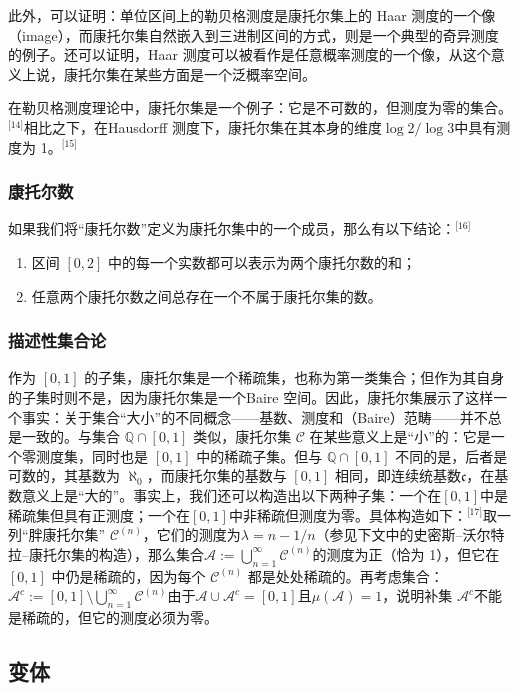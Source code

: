 此外，可以证明：单位区间上的勒贝格测度是康托尔集上的 Haar 测度的一个像（image），而康托尔集自然嵌入到三进制区间的方式，则是一个典型的奇异测度的例子。还可以证明，Haar 测度可以被看作是任意概率测度的一个像，从这个意义上说，康托尔集在某些方面是一个泛概率空间。

在勒贝格测度理论中，康托尔集是一个例子：它是不可数的，但测度为零的集合。\(^\text{[14]}\)相比之下，在Hausdorff 测度下，康托尔集在其本身的维度$\log 2 / \log 3$中具有测度为 1。\(^\text{[15]}\)
\subsubsection{康托尔数}
如果我们将“康托尔数”定义为康托尔集中的一个成员，那么有以下结论：\(^\text{[16]}\)
\begin{enumerate}
\item 区间 $[0, 2]$ 中的每一个实数都可以表示为两个康托尔数的和；
\item 任意两个康托尔数之间总存在一个不属于康托尔集的数。
\end{enumerate}
\subsubsection{描述性集合论}
作为 $[0,1]$ 的子集，康托尔集是一个稀疏集，也称为第一类集合；但作为其自身的子集时则不是，因为康托尔集是一个Baire 空间。因此，康托尔集展示了这样一个事实：关于集合“大小”的不同概念——基数、测度和（Baire）范畴——并不总是一致的。与集合 $\mathbb{Q} \cap [0,1]$ 类似，康托尔集 $\mathcal{C}$ 在某些意义上是“小”的：它是一个零测度集，同时也是 $[0,1]$ 中的稀疏子集。但与 $\mathbb{Q} \cap [0,1]$ 不同的是，后者是可数的，其基数为 $\aleph_0$，而康托尔集的基数与 $[0,1]$ 相同，即连续统基数$\mathfrak{c}$，在基数意义上是“大的”。事实上，我们还可以构造出以下两种子集：一个在$[0,1]$中是稀疏集但具有正测度；一个在$[0,1]$中非稀疏但测度为零。具体构造如下：\(^\text{[17]}\)取一列“胖康托尔集” $\mathcal{C}^{(n)}$，它们的测度为$\lambda= n - 1/n$（参见下文中的史密斯–沃尔特拉–康托尔集的构造），那么集合$\mathcal{A} := \bigcup_{n=1}^{\infty} \mathcal{C}^{(n)}$的测度为正（恰为 1），但它在 $[0,1]$ 中仍是稀疏的，因为每个 $\mathcal{C}^{(n)}$ 都是处处稀疏的。再考虑集合：$\mathcal{A}^c := [0,1] \setminus \bigcup_{n=1}^{\infty} \mathcal{C}^{(n)}$由于$\mathcal{A} \cup \mathcal{A}^c = [0,1]$且$\mu(\mathcal{A}) = 1$，说明补集 $\mathcal{A}^c$不能是稀疏的，但它的测度必须为零。
\subsection{变体}
